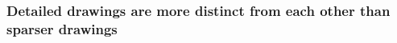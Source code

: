 \documentclass[10pt,letterpaper]{article}
\newcommand\norm[1]{\left\lVert#1\right\rVert}
\begin{document}

\subsubsection{Detailed drawings are more distinct from each other than sparser drawings}
\end{document}
